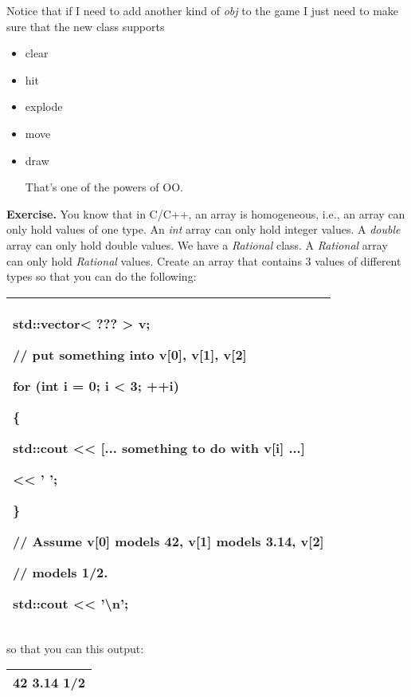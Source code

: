 \documentclass[
]{article}
\providecommand{\tightlist}{%
  \setlength{\itemsep}{0pt}\setlength{\parskip}{0pt}}
\begin{document}
Notice that if I need to add another kind of \emph{obj} to the game I
just need to make sure that the new class supports

\begin{itemize}
\tightlist
\item
  clear
\end{itemize}

\begin{itemize}
\item
  hit
\item
  explode
\item
  move
\item
  draw

  That's one of the powers of OO.
\end{itemize}

\textbf{Exercise.} You know that in C/C++, an array is homogeneous,
i.e., an array can only hold values of one type. An \emph{int} array can
only hold integer values. A \emph{double} array can only hold double
values. We have a \emph{Rational} class. A \emph{Rational} array can
only hold \emph{Rational} values. Create an array that contains 3 values
of different types so that you can do the following:

\begin{longtable}[]{@{}l@{}}
\toprule
\endhead
\begin{minipage}[t]{0.97\columnwidth}\raggedright
std::vector\textless{} ??? \textgreater{} v;

// put something into v{[}0{]}, v{[}1{]}, v{[}2{]}

for (int i = 0; i \textless{} 3; ++i)

\{

std::cout \textless\textless{} {[}... something to do with v{[}i{]}
...{]}

\textless\textless{} ' ';

\}

// Assume v{[}0{]} models 42, v{[}1{]} models 3.14, v{[}2{]}

// models 1/2.

std::cout \textless\textless{} '\textbackslash n';\strut
\end{minipage}\tabularnewline
\bottomrule
\end{longtable}

so that you can this output:

\begin{longtable}[]{@{}l@{}}
\toprule
\endhead
42 3.14 1/2\tabularnewline
\bottomrule
\end{longtable}
\end{document}
